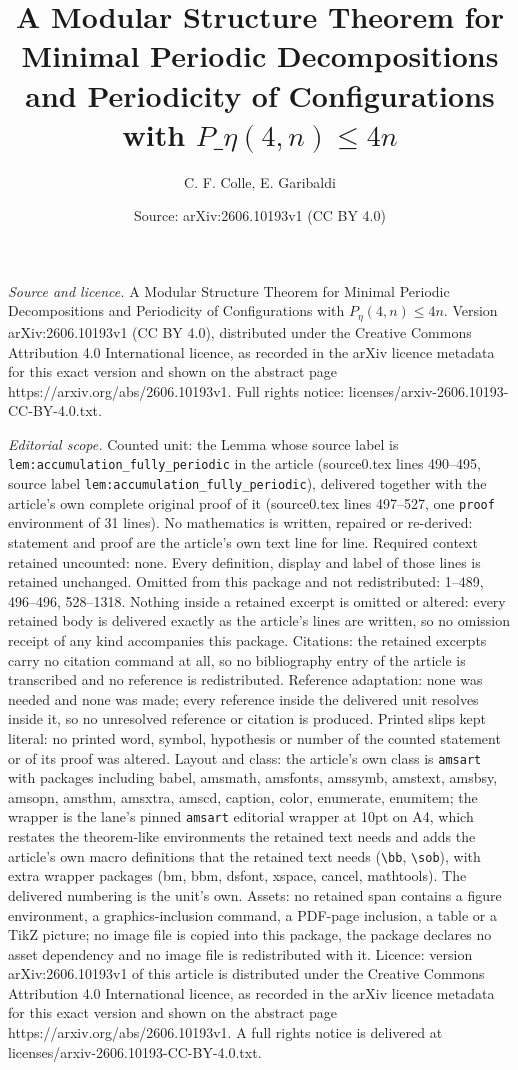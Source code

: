 \documentclass[10pt,a4paper]{amsart}
\title[A Modular Structure Theorem for Minimal Periodic Decompositi]{A Modular Structure Theorem for Minimal Periodic Decompositions and Periodicity of Configurations with $P\_{\eta}(4,n) \leq 4n$}
\author{C. F. Colle, E. Garibaldi}
\date{Source: arXiv:2606.10193v1 (CC BY 4.0)}
\begin{document}
\maketitle

\noindent\emph{Source and licence.} A Modular Structure Theorem for Minimal Periodic Decompositions and Periodicity of Configurations with $P_{\eta}(4,n) \leq 4n$. Version arXiv:2606.10193v1 (CC BY 4.0), distributed under the Creative Commons Attribution 4.0 International licence, as recorded in the arXiv licence metadata for this exact version and shown on the abstract page https://arxiv.org/abs/2606.10193v1. Full rights notice: licenses/arxiv-2606.10193-CC-BY-4.0.txt.\par\smallskip

\noindent\textit{Editorial scope.} Counted unit: the Lemma whose source label is \texttt{lem:accumulation\_fully\_periodic} in the article (source0.tex lines 490--495, source label \texttt{lem:accumulation\_fully\_periodic}), delivered together with the article's own complete original proof of it (source0.tex lines 497--527, one \texttt{proof} environment of 31 lines). No mathematics is written, repaired or re-derived: statement and proof are the article's own text line for line. Required context retained uncounted: none. Every definition, display and label of those lines is retained unchanged. Omitted from this package and not redistributed: 1--489, 496--496, 528--1318. Nothing inside a retained excerpt is omitted or altered: every retained body is delivered exactly as the article's lines are written, so no omission receipt of any kind accompanies this package. Citations: the retained excerpts carry no citation command at all, so no bibliography entry of the article is transcribed and no reference is redistributed. Reference adaptation: none was needed and none was made; every reference inside the delivered unit resolves inside it, so no unresolved reference or citation is produced. Printed slips kept literal: no printed word, symbol, hypothesis or number of the counted statement or of its proof was altered. Layout and class: the article's own class is \texttt{amsart} with packages including babel, amsmath, amsfonts, amssymb, amstext, amsbsy, amsopn, amsthm, amsxtra, amscd, caption, color, enumerate, enumitem; the wrapper is the lane's pinned \texttt{amsart} editorial wrapper at 10pt on A4, which restates the theorem-like environments the retained text needs and adds the article's own macro definitions that the retained text needs (\texttt{\textbackslash bb}, \texttt{\textbackslash sob}), with extra wrapper packages (bm, bbm, dsfont, xspace, cancel, mathtools). The delivered numbering is the unit's own. Assets: no retained span contains a figure environment, a graphics-inclusion command, a PDF-page inclusion, a table or a TikZ picture; no image file is copied into this package, the package declares no asset dependency and no image file is redistributed with it. Licence: version arXiv:2606.10193v1 of this article is distributed under the Creative Commons Attribution 4.0 International licence, as recorded in the arXiv licence metadata for this exact version and shown on the abstract page https://arxiv.org/abs/2606.10193v1. A full rights notice is delivered at licenses/arxiv-2606.10193-CC-BY-4.0.txt. 
\end{document}
